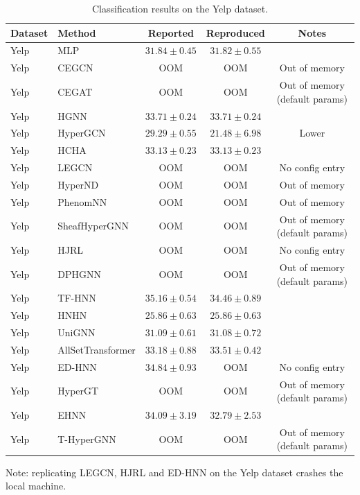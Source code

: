 \vspace{3em} 

\begin{table}[H]
    \centering \small
    \renewcommand{\arraystretch}{1.12} 
    \begin{tabular}{llccc}
        \toprule
        Dataset & Method & Reported & Reproduced & Notes \\
        \midrule
        Yelp & MLP & \(31.84 \pm 0.45\) & \(31.82 \pm 0.55\) & \\
        Yelp & CEGCN & OOM & OOM & Out of memory \\
        Yelp & CEGAT & OOM & OOM & Out of memory (default params) \\
        \grprule
        Yelp & HGNN & \(33.71 \pm 0.24\) & \(33.71 \pm 0.24\) & \\
        Yelp & HyperGCN & \(29.29 \pm 0.55\) & \(21.48 \pm 6.98\) & Lower \\
        Yelp & HCHA & \(33.13 \pm 0.23\) & \(33.13 \pm 0.23\) & \\
        Yelp & LEGCN & OOM & OOM & No config entry \\
        Yelp & HyperND & OOM & OOM & Out of memory \\
        Yelp & PhenomNN & OOM & OOM & Out of memory \\
        Yelp & SheafHyperGNN & OOM & OOM & Out of memory (default params) \\
        Yelp & HJRL & OOM & OOM & No config entry \\
        Yelp & DPHGNN & OOM & OOM & Out of memory (default params) \\
        Yelp & TF-HNN & \(35.16 \pm 0.54\) & \(34.46 \pm 0.89\) & \\
        \grprule
        Yelp & HNHN & \(25.86 \pm 0.63\) & \(25.86 \pm 0.63\) & \\
        Yelp & UniGNN & \(31.09 \pm 0.61\) & \(31.08 \pm 0.72\) & \\
        Yelp & AllSetTransformer & \(33.18 \pm 0.88\) & \(33.51 \pm 0.42\) & \\
        Yelp & ED-HNN & \(34.84 \pm 0.93\) & OOM & No config entry \\
        Yelp & HyperGT & OOM & OOM & Out of memory (default params) \\
        \grprule
        Yelp & EHNN & \(34.09 \pm 3.19\) & \(32.79 \pm 2.53\) &  \\
        Yelp & T-HyperGNN & OOM & OOM & Out of memory (default params) \\
        \bottomrule
    \end{tabular}
    \caption{Classification results on the Yelp dataset.}
    \vspace{0.3em} 
    \par\noindent Note: replicating LEGCN, HJRL and ED-HNN on the Yelp dataset crashes the local machine.
\end{table}


